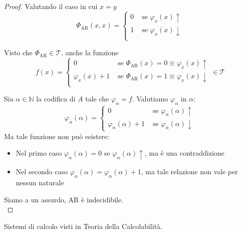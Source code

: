 \documentclass[12pt, answers]{exam}
\theoremstyle{plain}
\newcommand{\T}{\mathcal{T}}
\newcommand{\N}{\mathbb{N}}
\newcommand{\ar}{\text{AR}}
\begin{document}
\begin{questions}
\begin{solution}
\begin{proof}
                Valutando il caso in cui $x = y$
                $$
                \Phi_{\ar} (x,x) = \begin{cases}
                    0 & \text{ se } \varphi_x (x) \uparrow \\
                    1 & \text{ se } \varphi_x (x) \downarrow \\
                \end{cases}
                $$
                
                Visto che $\Phi_{\ar} \in \T$, anche la funzione
                $$
                f(x) = \begin{cases}
                    0 & \text{ se } \Phi_{\ar} (x) = 0 \equiv \varphi_x (x) \uparrow \\
                    \varphi_x (x) + 1 & \text{ se } \Phi_{\ar} (x) = 1 \equiv \varphi_x (x) \downarrow \\
                \end{cases}
                \in \T
                $$
                
                Sia $\alpha \in \N$ la codifica di $A$ tale che $\varphi_\alpha = f$. Valutiamo $\varphi_\alpha$ in $\alpha$:
                $$
                \varphi_\alpha (\alpha) = \begin{cases}
                    0 & \text{ se } \varphi_\alpha (\alpha) \uparrow \\
                    \varphi_\alpha (\alpha) + 1 & \text{ se } \varphi_\alpha (\alpha) \downarrow
                \end{cases}
                $$
                Ma tale funzione non può esistere: 
                \begin{itemize}
                    \item Nel primo caso $\varphi_\alpha (\alpha) = 0$ se $\varphi_\alpha (\alpha) \uparrow$, ma è una contraddizione
                    
                    \item Nel secondo caso $\varphi_\alpha (\alpha) = \varphi_\alpha (\alpha) + 1$, ma tale relazione non vale per nessun naturale
                \end{itemize}
                
                Siamo a un assurdo, $\ar$ è indecidibile. \\
            \end{proof}
        \end{solution}
        
        \question Sistemi di calcolo visti in Teoria della Calcolabilità.
        

\end{questions}
\end{document}
